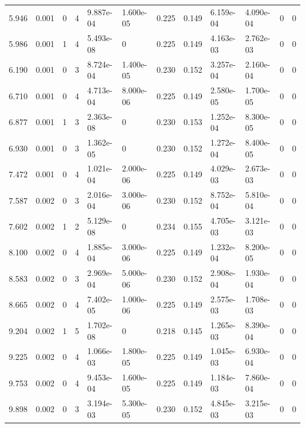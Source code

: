\documentclass[preview]{standalone}
\begin{document}
{{\begin{tabular}{L{1.2cm}C{1.2cm} C{0.3cm}C{0.5cm} C{1.4cm}C{1.4cm} C{1.4cm}C{1.4cm} C{1.6cm}C{1.6cm} C{1.6cm}C{1.6cm}}
  5.946  &  0.001  & 0     &  4 &  9.887e-04  & 1.600e-05  &  0.225&   0.149& 6.159e-04 & 4.090e-04   &  0 & 0  \\ 
  5.986  &  0.001  & 1     &  4 &  5.493e-08  & 0  &  0.225&   0.149& 4.163e-03 & 2.762e-03   &  0 & 0  \\ 
  6.190  &  0.001  & 0     &  3 &  8.724e-04  & 1.400e-05  &  0.230&   0.152& 3.257e-04 & 2.160e-04   &  0 & 0  \\ 
  6.710  &  0.001  & 0     &  4 &  4.713e-04  & 8.000e-06  &  0.225&   0.149& 2.580e-05 & 1.700e-05   &  0 & 0  \\ 
  6.877  &  0.001  & 1     &  3 &  2.363e-08  & 0  &  0.230&   0.153& 1.252e-04 & 8.300e-05   &  0 & 0  \\ 
  6.930  &  0.001  & 0     &  3 &  1.362e-05  & 0  &  0.230&   0.152& 1.272e-04 & 8.400e-05   &  0 & 0  \\ 
  7.472  &  0.001  & 0     &  4 &  1.021e-04  & 2.000e-06  &  0.225&   0.149& 4.029e-03 & 2.673e-03   &  0 & 0  \\ 
  7.587  &  0.002  & 0     &  3 &  2.016e-04  & 3.000e-06  &  0.230&   0.152& 8.752e-04 & 5.810e-04   &  0 & 0  \\ 
  7.602  &  0.002  & 1     &  2 &  5.129e-08  & 0  &  0.234&   0.155& 4.705e-03 & 3.121e-03   &  0 & 0  \\ 
  8.100  &  0.002  & 0     &  4 &  1.885e-04  & 3.000e-06  &  0.225&   0.149& 1.232e-04 & 8.200e-05   &  0 & 0  \\ 
  8.583  &  0.002  & 0     &  3 &  2.969e-04  & 5.000e-06  &  0.230&   0.152& 2.908e-04 & 1.930e-04   &  0 & 0  \\ 
  8.665  &  0.002  & 0     &  4 &  7.402e-05  & 1.000e-06  &  0.225&   0.149& 2.575e-03 & 1.708e-03   &  0 & 0  \\ 
  9.204  &  0.002  & 1     &  5 &  1.702e-08  & 0  &  0.218&   0.145& 1.265e-03 & 8.390e-04   &  0 & 0  \\ 
  9.225  &  0.002  & 0     &  4 &  1.066e-03  & 1.800e-05  &  0.225&   0.149& 1.045e-03 & 6.930e-04   &  0 & 0  \\ 
  9.753  &  0.002  & 0     &  4 &  9.453e-04  & 1.600e-05  &  0.225&   0.149& 1.184e-03 & 7.860e-04   &  0 & 0  \\ 
  9.898  &  0.002  & 0     &  3 &  3.194e-03  & 5.300e-05  &  0.230&   0.152& 4.845e-03 & 3.215e-03   &  0 & 0  \\ 
\hline 
\end{tabular} 

}}
\end{document}
